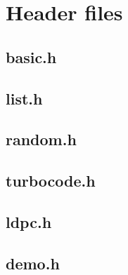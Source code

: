 \documentclass{article}
\begin{document}
\section{Header files}


\subsection{basic.h}

\newpage

\subsection{list.h}

\newpage

\subsection{random.h}

\newpage

\subsection{turbocode.h}

\newpage

\subsection{ldpc.h}

\newpage

\subsection{demo.h}

\newpage
\end{document}
